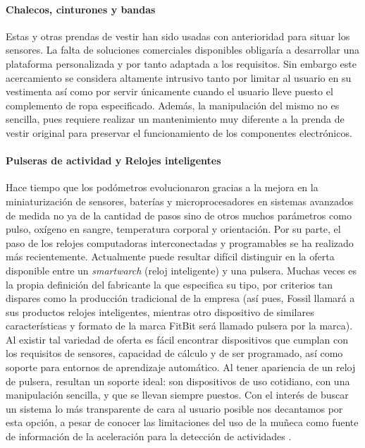 \paragraph{Chalecos, cinturones y bandas} Estas y otras prendas de vestir han sido usadas con anterioridad \cite{Liu2020, MobiFall} para situar los sensores. La falta de soluciones comerciales disponibles obligaría a desarrollar una plataforma personalizada y por tanto adaptada a los requisitos. Sin embargo este acercamiento se considera altamente intrusivo tanto por limitar al usuario en su vestimenta así como por servir únicamente cuando el usuario lleve puesto el complemento de ropa especificado. Además, la manipulación del mismo no es sencilla, pues requiere realizar un mantenimiento muy diferente a la prenda de vestir original para preservar el funcionamiento de los componentes electrónicos.

\paragraph{Pulseras de actividad y Relojes inteligentes} Hace tiempo que los podómetros evolucionaron gracias a la mejora en la miniaturización de sensores, baterías y microprocesadores en sistemas avanzados de medida no ya de la cantidad de pasos sino de otros muchos parámetros como pulso, oxígeno en sangre, temperatura corporal y orientación. Por su parte, el paso de los relojes computadoras interconectadas y programables se ha realizado más recientemente. Actualmente puede resultar difícil distinguir en la oferta disponible entre un \textit{smartwarch} (reloj inteligente) y una pulsera. Muchas veces es la propia definición del fabricante la que especifica su tipo, por criterios tan dispares como la producción tradicional de la empresa (así pues, Fossil llamará a sus productos relojes inteligentes, mientras otro dispositivo de similares características y formato de la marca FitBit será llamado pulsera por la marca). Al existir tal variedad de oferta es fácil encontrar dispositivos que cumplan con los requisitos de sensores, capacidad de cálculo y de ser programado, así como soporte para entornos de aprendizaje automático. Al tener apariencia de un reloj de pulsera, resultan un soporte ideal: son dispositivos de uso cotidiano, con una manipulación sencilla, y que se llevan siempre puestos. Con el interés de buscar un sistema lo más transparente de cara al usuario posible nos decantamos por esta opción, a pesar de conocer las limitaciones del uso de la muñeca como fuente de información de la aceleración para la detección de actividades \cite{Chen2005} .

